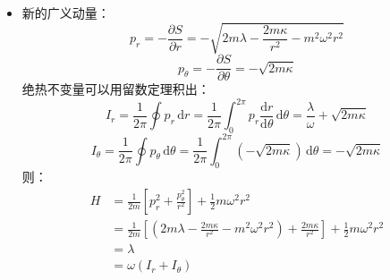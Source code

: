 \documentclass[a4paper,fontset=windows]{ctexart}
\begin{document}
\begin{itemize}
        \item[3.(i)]
        新的广义动量：
        \[
        p_r = -\frac{\partial S}{\partial r} = -\sqrt{2m\lambda - \frac{2m\kappa}{r^2} - m^2 \omega^2 r^2}
        \]
        \[
        p_\theta = -\frac{\partial S}{\partial\theta} = -\sqrt{2m\kappa}
        \]
        绝热不变量可以用留数定理积出：
        \[
        I_r = \frac{1}{2\pi}\oint p_r \,\mathrm{d}r = \frac{1}{2\pi}\int_0^{2\pi} p_r \frac{\mathrm{d}r}{\mathrm{d}\theta}\,\mathrm{d}\theta = \frac{\lambda}{\omega} + \sqrt{2m\kappa}
        \]
        \[
        I_\theta = \frac{1}{2\pi}\oint p_\theta \,\mathrm{d}\theta = \frac{1}{2\pi}\int_0^{2\pi} \left(-\sqrt{2m\kappa}\right)\,\mathrm{d}\theta = -\sqrt{2m\kappa}
        \]
        则：
        \begin{align*}
            H
            &= \frac{1}{2m}\left[p_r^2 + \frac{p_\theta^2}{r^2}\right] + \frac{1}{2}m\omega^2r^2 \\
            &= \frac{1}{2m}\left[\left(2m\lambda - \frac{2m\kappa}{r^2} - m^2 \omega^2 r^2\right) + \frac{2m\kappa}{r^2}\right]  + \frac{1}{2}m\omega^2r^2 \\
            &= \lambda \\
            &= \omega(I_r + I_\theta)
        \end{align*}

    \end{itemize}
\end{document}
